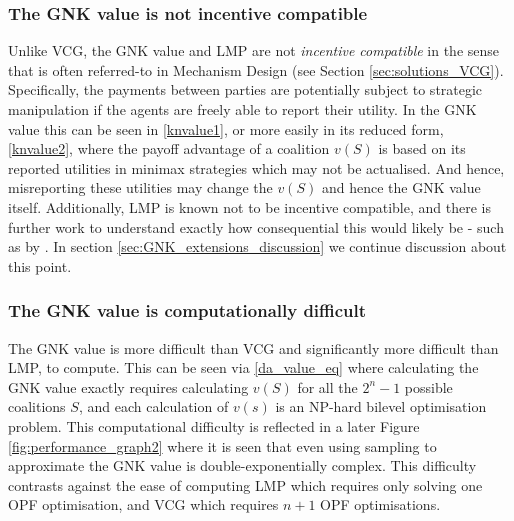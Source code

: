 \subsubsection*{The GNK value is not incentive compatible}
Unlike VCG, the GNK value and LMP are not \emph{incentive compatible} in the sense that is often referred-to in Mechanism Design (see Section \ref{sec:solutions_VCG}).
Specifically, the payments between parties are potentially subject to strategic manipulation if the agents are freely able to report their utility.
In the GNK value this can be seen in \eqref{knvalue1}, or more easily in its reduced form, \eqref{knvalue2}, where the payoff advantage of a coalition $v(S)$ is based on its reported utilities in minimax strategies which may not be actualised.
And hence, misreporting these utilities may change the $v(S)$ and hence the GNK value itself.
Additionally, LMP is known not to be incentive compatible, and there is further work to understand exactly how consequential this would likely be - such as by \cite{8054716}.
In section \ref{sec:GNK_extensions_discussion} we continue discussion about this point.

\subsubsection*{The GNK value is computationally difficult}
The GNK value is more difficult than VCG and significantly more difficult than LMP, to compute.
This can be seen via \eqref{da_value_eq} where calculating the GNK value exactly requires calculating $v(S)$ for all the $2^n-1$ possible coalitions $S$, and each calculation of $v(s)$ is an NP-hard bilevel optimisation problem.
This computational difficulty is reflected in a later Figure \ref{fig:performance_graph2} where it is seen that even using sampling to approximate the GNK value is double-exponentially complex. 
This difficulty contrasts against the ease of computing LMP which requires only solving one OPF optimisation, and VCG which requires $n+1$ OPF optimisations.\\




